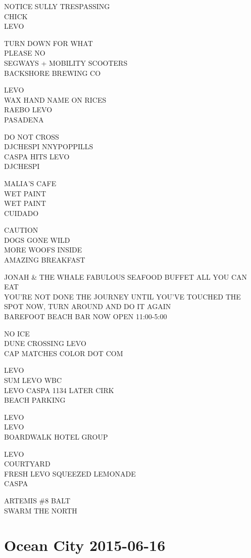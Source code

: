 \documentclass[10pt,letterpaper]{article}
\begin{document}
NOTICE SULLY TRESPASSING\\
CHICK\\
LEVO

TURN DOWN FOR WHAT\\
PLEASE NO\\
SEGWAYS + MOBILITY SCOOTERS\\
BACKSHORE BREWING CO

LEVO\\
WAX HAND NAME ON RICES\\
RAEBO LEVO\\
PASADENA

DO NOT CROSS\\
DJCHESPI NNYPOPPILLS\\
CASPA HITS LEVO\\
DJCHESPI

MALIA'S CAFE\\
WET PAINT\\
WET PAINT\\
CUIDADO

CAUTION\\
DOGS GONE WILD\\
MORE WOOFS INSIDE\\
AMAZING BREAKFAST

JONAH \& THE WHALE FABULOUS SEAFOOD BUFFET ALL YOU CAN EAT\\
YOU'RE NOT DONE THE JOURNEY UNTIL YOU'VE TOUCHED THE SPOT NOW, TURN AROUND AND DO IT AGAIN\\
BAREFOOT BEACH BAR NOW OPEN 11:00{-}5:00

NO ICE\\
DUNE CROSSING LEVO\\
CAP MATCHES COLOR DOT COM

LEVO\\
SUM LEVO WBC\\
LEVO CASPA 1134 LATER CIRK\\
BEACH PARKING

LEVO\\
LEVO\\
BOARDWALK HOTEL GROUP

LEVO\\
COURTYARD\\
FRESH LEVO SQUEEZED LEMONADE\\
CASPA

ARTEMIS \#8 BALT\\
SWARM THE NORTH
\pagebreak

\section*{Ocean City 2015-06-16}
\end{document}
